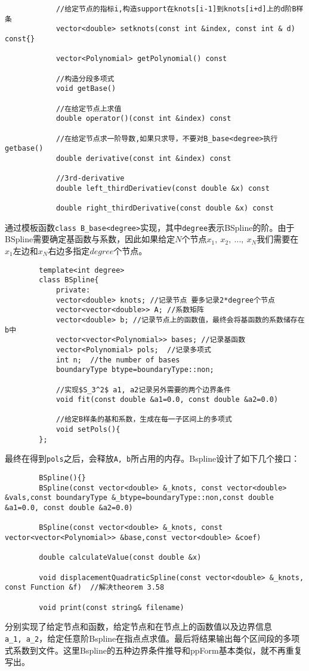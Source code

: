 \documentclass[UTF8]{ctexart}
\begin{document}
\begin{enumerate}
\begin{lstlisting}
			//给定节点的指标i,构造support在knots[i-1]到knots[i+d]上的d阶B样条
			vector<double> setknots(const int &index, const int & d) const{}
				
			vector<Polynomial> getPolynomial() const
				
			//构造分段多项式
			void getBase()
				
			//在给定节点上求值
			double operator()(const int &index) const
				
			//在给定节点求一阶导数,如果只求导，不要对B_base<degree>执行getbase()
			double derivative(const int &index) const
				
			//3rd-derivative
			double left_thirdDerivatiev(const double &x) const
				
			double right_thirdDerivative(const double &x) const
		\end{lstlisting}
		通过模板函数\texttt{class B\_base<degree>}实现，其中\texttt{degree}表示BSpline的阶。由于BSpline需要确定基函数与系数，因此如果给定$N$个节点$x_1,\ x_2,\ ...,\ x_N$我们需要在$x_1$左边和$x_N$右边多指定$degree$个节点。
		\begin{lstlisting}
		template<int degree>
		class BSpline{
			private:
			vector<double> knots; //记录节点 要多记录2*degree个节点
			vector<vector<double>> A; //系数矩阵
			vector<double> b; //记录节点上的函数值，最终会将基函数的系数储存在b中
			vector<vector<Polynomial>> bases; //记录基函数
			vector<Polynomial> pols;  //记录多项式
			int n;  //the number of bases
			boundaryType btype=boundaryType::non;
			
			//实现$S_3^2$ a1, a2记录另外需要的两个边界条件
			void fit(const double &a1=0.0, const double &a2=0.0)
			
			//给定B样条的基和系数，生成在每一子区间上的多项式
			void setPols(){
		};
		\end{lstlisting}
		最终在得到\texttt{pols}之后，会释放\texttt{A,\ b}所占用的内存。Bspline设计了如下几个接口：
		\begin{lstlisting}
		BSpline(){}
		BSpline(const vector<double> &_knots, const vector<double> &vals,const boundaryType &_btype=boundaryType::non,const double &a1=0.0, const double &a2=0.0)
		
		BSpline(const vector<double> &_knots, const vector<vector<Polynomial>> &base,const vector<double> &coef)
		
		double calculateValue(const double &x)
		
		void displacementQuadraticSpline(const vector<double> &_knots, const Function &f)  //解决theorem 3.58
		
		void print(const string& filename)
		\end{lstlisting}
		分别实现了给定节点和函数，给定节点和在节点上的函数值以及边界信息\texttt{a\_1,\ a\_2}，给定任意阶Bspline在指点点求值。最后将结果输出每个区间段的多项式系数到文件。这里Bspline的五种边界条件推导和ppForm基本类似，就不再重复写出。
	\end{enumerate}
\end{document}

